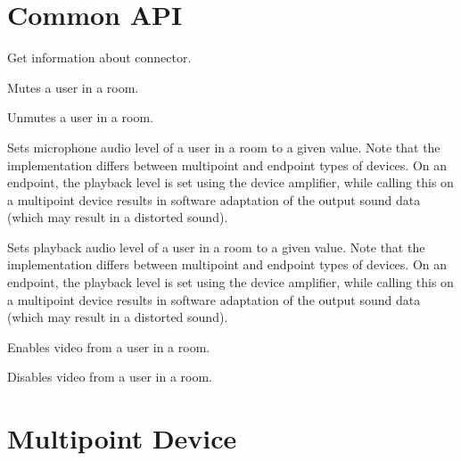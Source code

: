 \section{Common API}

\begin{Api}

Get information about connector.

Mutes a user in a room.

Unmutes a user in a room.

Sets microphone audio level of a user in a room to a given value. Note that the implementation differs between multipoint and endpoint types of devices. On an endpoint, the playback level is set using the device amplifier, while calling this on a multipoint device results in software adaptation of the output sound data (which may result in a distorted sound).

Sets playback audio level of a user in a room to a given value. Note that the implementation differs between multipoint and endpoint types of devices. On an endpoint, the playback level is set using the device amplifier, while calling this on a multipoint device results in software adaptation of the output sound data (which may result in a distorted sound).

Enables video from a user in a room.

Disables video from a user in a room.

\end{Api}

\section{Multipoint Device} \label{sect:connector-api-multipoint}

